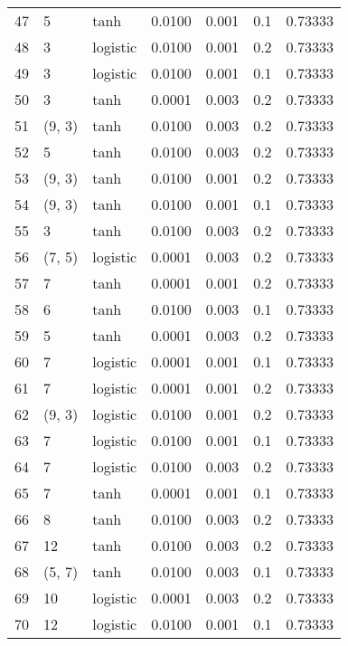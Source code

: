\begin{tabular}{lllrrrr}
47  &           5 &      tanh &  0.0100 &  0.001 &  0.1 &   0.73333 \\
48  &           3 &  logistic &  0.0100 &  0.001 &  0.2 &   0.73333 \\
49  &           3 &  logistic &  0.0100 &  0.001 &  0.1 &   0.73333 \\
50  &           3 &      tanh &  0.0001 &  0.003 &  0.2 &   0.73333 \\
51  &      (9, 3) &      tanh &  0.0100 &  0.003 &  0.2 &   0.73333 \\
52  &           5 &      tanh &  0.0100 &  0.003 &  0.2 &   0.73333 \\
53  &      (9, 3) &      tanh &  0.0100 &  0.001 &  0.2 &   0.73333 \\
54  &      (9, 3) &      tanh &  0.0100 &  0.001 &  0.1 &   0.73333 \\
55  &           3 &      tanh &  0.0100 &  0.003 &  0.2 &   0.73333 \\
56  &      (7, 5) &  logistic &  0.0001 &  0.003 &  0.2 &   0.73333 \\
57  &           7 &      tanh &  0.0001 &  0.001 &  0.2 &   0.73333 \\
58  &           6 &      tanh &  0.0100 &  0.003 &  0.1 &   0.73333 \\
59  &           5 &      tanh &  0.0001 &  0.003 &  0.2 &   0.73333 \\
60  &           7 &  logistic &  0.0001 &  0.001 &  0.1 &   0.73333 \\
61  &           7 &  logistic &  0.0001 &  0.001 &  0.2 &   0.73333 \\
62  &      (9, 3) &  logistic &  0.0100 &  0.001 &  0.2 &   0.73333 \\
63  &           7 &  logistic &  0.0100 &  0.001 &  0.1 &   0.73333 \\
64  &           7 &  logistic &  0.0100 &  0.003 &  0.2 &   0.73333 \\
65  &           7 &      tanh &  0.0001 &  0.001 &  0.1 &   0.73333 \\
66  &           8 &      tanh &  0.0100 &  0.003 &  0.2 &   0.73333 \\
67  &          12 &      tanh &  0.0100 &  0.003 &  0.2 &   0.73333 \\
68  &      (5, 7) &      tanh &  0.0100 &  0.003 &  0.1 &   0.73333 \\
69  &          10 &  logistic &  0.0001 &  0.003 &  0.2 &   0.73333 \\
70  &          12 &  logistic &  0.0100 &  0.001 &  0.1 &   0.73333 \\

\end{tabular}
